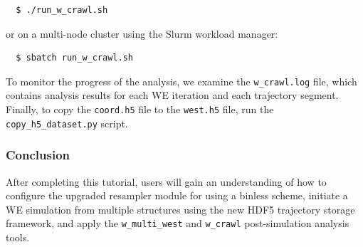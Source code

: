 \begin{verbatim}
  $ ./run_w_crawl.sh
\end{verbatim}

or on a multi-node cluster using the Slurm workload manager:
\begin{verbatim}
  $ sbatch run_w_crawl.sh
\end{verbatim}


To monitor the progress of the analysis, we examine the \verb|w_crawl.log| file, which contains analysis results for each WE iteration and each trajectory segment.
Finally, to copy the \verb|coord.h5| file to the \verb|west.h5| file, run the \verb|copy_h5_dataset.py| script.

\subsubsection{Conclusion} After completing this tutorial, users will gain an understanding of how to configure the upgraded resampler module for using a binless scheme, initiate a WE simulation from multiple structures using the new HDF5 trajectory storage framework, and apply the \verb|w_multi_west| and \verb|w_crawl| post-simulation analysis tools. 